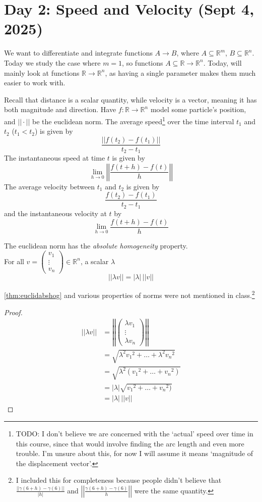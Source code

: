 \section{Day 2: Speed and Velocity (Sept 4, 2025)}

We want to differentiate and integrate functions $A \to B$, where $A \subseteq \mathbb{R}^m$, $B \subseteq \mathbb{R}^n$. Today we study the case where $m = 1$, so functions $A \subseteq \mathbb{R} \to \mathbb{R}^n$. Today, will mainly look at functions $\mathbb{R} \to \mathbb{R}^n$, as having a single parameter makes them much easier to work with.

Recall that distance is a scalar quantity, while velocity is a vector, meaning it has both magnitude and direction. Have $f: \mathbb{R} \to \mathbb{R}^n$ model some particle's position, and $||\cdot||$ be the euclidean norm. The average speed\footnote{TODO: I don't believe we are concerned with the `actual' speed over time in this course, since that would involve finding the arc length and even more trouble. I'm unsure about this, for now I will assume it means `magnitude of the displacement vector'.} over the time interval $t_1$ and $t_2$ ($t_1 < t_2$) is given by
\[
\frac{||f(t_2) - f(t_1)||}{t_2-t_1}
\]
The instantaneous speed at time $t$ is given by
\[
\lim_{ h \to 0 } \left|\left|\frac{f(t + h) - f(t)}{h} \right|\right|
\]
The average velocity between $t_1$ and $t_2$ is given by
\[
\frac{f(t_2) - f(t_1)}{t_2 - t_1}
\]
and the instantaneous velocity at $t$ by
\[
\lim_{ h \to 0 } \frac{f(t + h) - f(t)}{h}
\]
\begin{theorem} \label{thm:euclidabshog}
The euclidean norm has the \textit{absolute homogeneity} property. \\
    For all $v = \begin{pmatrix}
v_1 \\ \vdots \\ v_n
\end{pmatrix} \in \mathbb{R}^n$, a scalar $\lambda$
\[
|| \lambda v || = |\lambda| \, ||v||
\]
\end{theorem}
\ref{thm:euclidabshog} and various properties of norms were not mentioned in class.\footnote{I included this for completeness because people didn't believe that $\frac{||\gamma(6 + h) - \gamma(6)||}{|h|}$ and $\left|\left| \frac{\gamma(6 + h) - \gamma(6)}{h} \right|\right|$ were the same quantity.}
\begin{proof}

\begin{align*}
    ||\lambda v|| &= \left|\left|\begin{pmatrix}
\lambda v_1 \\ \vdots \\ \lambda v_n
\end{pmatrix} \right|\right| \\
    &= \sqrt{\lambda^2 {v_1}^2 + \dots + \lambda^2 {v_n}^2} \\
    &= \sqrt{\lambda^2 ({v_1}^2 + \dots + {v_n}^2)} \\
    &= |\lambda| \sqrt{{v_1}^2 + \dots + {v_n}^2)} \\
    &= |\lambda| \, ||v||
\end{align*}

\end{proof}
